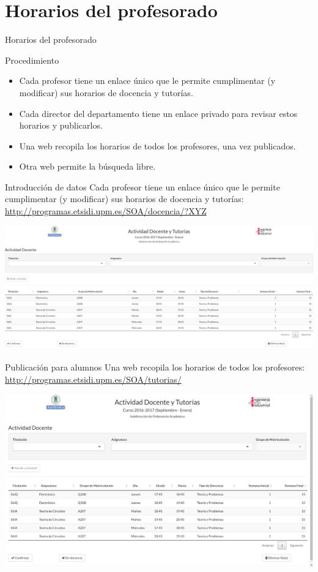 \documentclass[spanish, xcolor={usenames,svgnames,dvipsnames}]{beamer}
\begin{document}
\section{Horarios del profesorado}
\label{sec:orgea25722}
\begin{frame}[label={sec:org65a38a9}]{Horarios del profesorado}
\begin{block}{Procedimiento}
\begin{itemize}
\item Cada profesor tiene un enlace único que le permite cumplimentar (y modificar) sus horarios de docencia y tutorías.
\item Cada director del departamento tiene un enlace privado para revisar estos horarios y publicarlos.
\item Una web recopila los horarios de todos los profesores, una vez publicados.
\item Otra web permite la búsqueda libre.
\end{itemize}
\end{block}
\end{frame}

\begin{frame}[label={sec:org287cd4f}]{Introducción de datos}
Cada profesor tiene un enlace único que le permite cumplimentar (y modificar) sus horarios de docencia y tutorías: \url{http://programas.etsidi.upm.es/SOA/docencia/?XYZ}

\begin{center}
\includegraphics[width=.9\linewidth]{images/formulario-docencia.png}
\end{center}
\end{frame}

\begin{frame}[label={sec:org3d19b59}]{Publicación para alumnos}
Una web recopila los horarios de todos los profesores: \url{http://programas.etsidi.upm.es/SOA/tutorias/}

\begin{center}
\includegraphics[width=.9\linewidth]{images/tutorias.png}
\end{center}
\end{frame}
\end{document}
